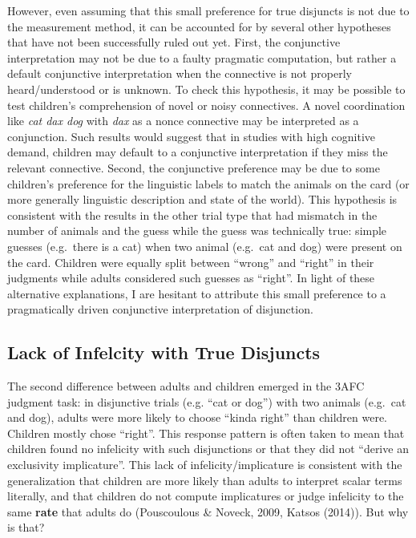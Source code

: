 \documentclass[oneside]{report}
\theoremstyle{definition}
\theoremstyle{definition}
\theoremstyle{definition}
\theoremstyle{remark}
\begin{document}
However, even assuming that this small preference for true disjuncts is
not due to the measurement method, it can be accounted for by several
other hypotheses that have not been successfully ruled out yet. First,
the conjunctive interpretation may not be due to a faulty pragmatic
computation, but rather a default conjunctive interpretation when the
connective is not properly heard/understood or is unknown. To check this
hypothesis, it may be possible to test children's comprehension of novel
or noisy connectives. A novel coordination like \emph{cat dax dog} with
\emph{dax} as a nonce connective may be interpreted as a conjunction.
Such results would suggest that in studies with high cognitive demand,
children may default to a conjunctive interpretation if they miss the
relevant connective. Second, the conjunctive preference may be due to
some children's preference for the linguistic labels to match the
animals on the card (or more generally linguistic description and state
of the world). This hypothesis is consistent with the results in the
other trial type that had mismatch in the number of animals and the
guess while the guess was technically true: simple guesses (e.g.~there
is a cat) when two animal (e.g.~cat and dog) were present on the card.
Children were equally split between ``wrong'' and ``right'' in their
judgments while adults considered such guesses as ``right''. In light of
these alternative explanations, I are hesitant to attribute this small
preference to a pragmatically driven conjunctive interpretation of
disjunction.

\subsection{Lack of Infelcity with True
Disjuncts}\label{lack-of-infelcity-with-true-disjuncts}

The second difference between adults and children emerged in the 3AFC
judgment task: in disjunctive trials (e.g. ``cat or dog'') with two
animals (e.g.~cat and dog), adults were more likely to choose ``kinda
right'' than children were. Children mostly chose ``right''. This
response pattern is often taken to mean that children found no
infelicity with such disjunctions or that they did not ``derive an
exclusivity implicature''. This lack of infelicity/implicature is
consistent with the generalization that children are more likely than
adults to interpret scalar terms literally, and that children do not
compute implicatures or judge infelicity to the same \textbf{rate} that
adults do (Pouscoulous \& Noveck, 2009, Katsos (2014)). But why is that?
\end{document}
